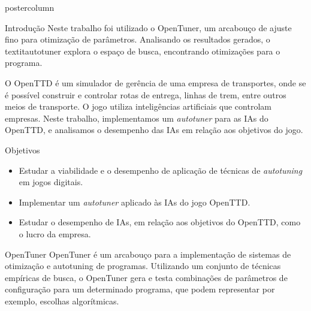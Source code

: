 \documentclass[final]{beamer}
\begin{document}
\begin{frame}
\begin{columns}
\begin{column}{.5\textwidth}
\begin{beamercolorbox}[center,wd=\textwidth]{postercolumn}
\begin{minipage}[T]{.95\textwidth}
{\begin{block}{Introdução}
                Neste trabalho foi utilizado o OpenTuner, um arcabouço de ajuste fino para otimização de parâmetros. Analisando os resultados gerados, o textit{autotuner} explora o espaço de busca, encontrando otimizações para o programa.
                
                \vspace*{0.15cm}
                
                O OpenTTD é um simulador de gerência de uma empresa de transportes, onde se é possível construir e controlar rotas de entrega, linhas de trem, entre outros meios de transporte. O jogo utiliza inteligências artificiais que controlam empresas. Neste trabalho, implementamos um \textit{autotuner} para as IAs do OpenTTD, e analisamos o desempenho das IAs em relação aos objetivos do jogo.

                
            \end{block}
            
            \vspace*{0.2cm}

            \begin{block}{Objetivos}
              \justifying
              \begin{itemize}
                \item Estudar a viabilidade e o desempenho de aplicação de técnicas de \textit{autotuning} em jogos digitais.
                \item Implementar um \textit{autotuner} aplicado às IAs do jogo OpenTTD.
                \item Estudar o desempenho de IAs, em relação aos objetivos do OpenTTD, como o lucro da empresa.
              \end{itemize}
              \vspace*{0.2cm} 
            \end{block}
            
            \vspace*{0.2cm}

            \begin{block}{OpenTuner}
            \justifying
                OpenTuner é um arcabouço para a implementação de sistemas de otimização e autotuning de programas. Utilizando um conjunto de técnicas empíricas de busca, o OpenTuner gera e testa combinações de parâmetros de configuração para um determinado programa, que podem representar por exemplo, escolhas algorítmicas. 
                

\end{block}}
\end{minipage}
\end{beamercolorbox}
\end{column}
\end{columns}
\end{frame}
\end{document}

